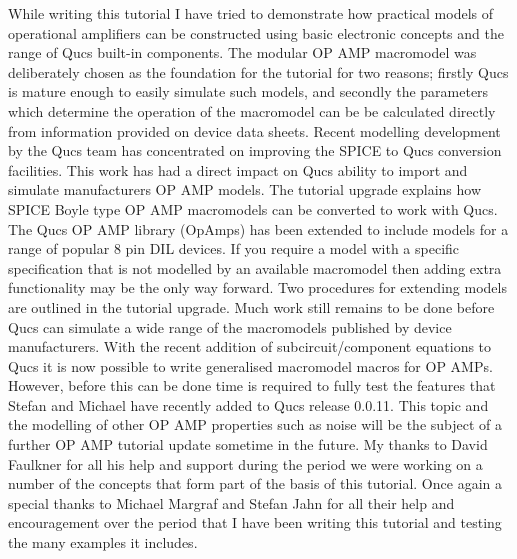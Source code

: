 %
%
%
%

\renewcommand{\thesubfigure}{\thefigure(\alph{subfigure})}
\makeatletter
  \renewcommand{\@thesubfigure}{\thesubfigure:\space}
  \renewcommand{\p@subfigure}{}
\makeatother

\renewcommand{\thesubtable}{\thetable(\alph{subtable})}
\makeatletter
  \renewcommand{\@thesubtable}{\thesubtable:\space}
  \renewcommand{\p@subtable}{}
\makeatother



While writing this tutorial I have tried to demonstrate how practical models of
operational amplifiers can be constructed using basic electronic concepts and
the range of Qucs built-in components.  The modular OP AMP macromodel was
deliberately chosen as the foundation for the tutorial for two reasons; firstly
Qucs is mature enough to easily simulate such models, and secondly the
parameters which determine the operation of the macromodel can be be calculated
directly from information provided on device data sheets. Recent modelling
development by the Qucs team has concentrated on improving the SPICE to Qucs
conversion facilities. This work has had a direct impact on Qucs ability to
import and simulate manufacturers OP AMP models. The tutorial upgrade explains
how SPICE Boyle type OP AMP macromodels can be converted to work with Qucs. The
Qucs OP AMP library (OpAmps) has been extended to include models for a range of
popular 8 pin DIL devices. If you require a model with a specific specification
that is not 
modelled by an available macromodel then adding extra functionality may be the
only way forward.  Two procedures for extending models are outlined in the
tutorial upgrade. Much work still remains to be done before Qucs can simulate a
wide range of the macromodels published by device manufacturers.  With the
recent addition of subcircuit/component equations to Qucs it is now possible to
write generalised macromodel macros for OP AMPs.  However, before this can be
done time is required to fully test the features that Stefan and Michael have
recently added to Qucs release 0.0.11. This topic and the modelling of other OP
AMP properties such as noise will be the subject of a further OP AMP tutorial
update sometime in the future.  My thanks to David Faulkner for all his help and
support during the period we were working on a number of the concepts that form
part of the basis of this tutorial. Once again a special thanks to Michael
Margraf and Stefan Jahn for all their help and encouragement over the period
that I 
have been writing this tutorial and testing the many examples it includes.